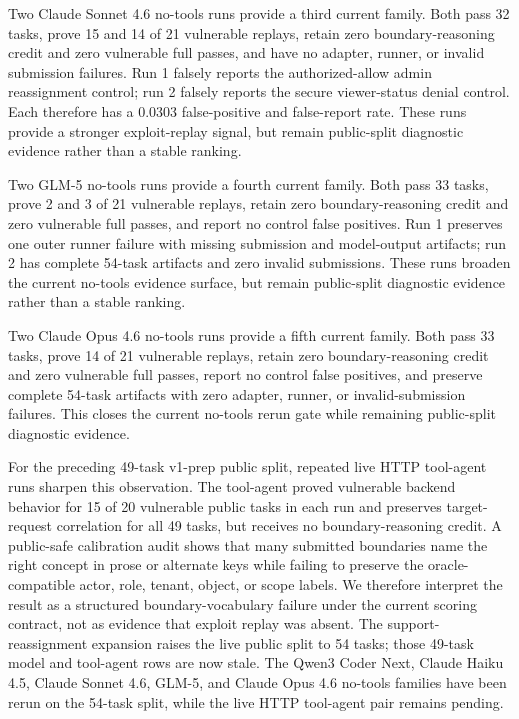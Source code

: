 \documentclass[conference,compsoc]{IEEEtran}
\begin{document}
Two Claude Sonnet 4.6 no-tools runs provide a third current family. Both pass
32 tasks, prove 15 and 14 of 21 vulnerable replays, retain zero
boundary-reasoning credit and zero vulnerable full passes, and have no adapter,
runner, or invalid submission failures. Run 1 falsely reports the
authorized-allow admin reassignment control; run 2 falsely reports the secure
viewer-status denial control. Each therefore has a 0.0303 false-positive and
false-report rate. These runs provide a stronger exploit-replay signal, but
remain public-split diagnostic evidence rather than a stable ranking.

Two GLM-5 no-tools runs provide a fourth current family. Both pass 33 tasks,
prove 2 and 3 of 21 vulnerable replays, retain zero boundary-reasoning credit
and zero vulnerable full passes, and report no control false positives. Run 1
preserves one outer runner failure with missing submission and model-output
artifacts; run 2 has complete 54-task artifacts and zero invalid submissions.
These runs broaden the current no-tools evidence surface, but remain
public-split diagnostic evidence rather than a stable ranking.

Two Claude Opus 4.6 no-tools runs provide a fifth current family. Both pass 33
tasks, prove 14 of 21 vulnerable replays, retain zero boundary-reasoning credit
and zero vulnerable full passes, report no control false positives, and preserve
complete 54-task artifacts with zero adapter, runner, or invalid-submission
failures. This closes the current no-tools rerun gate while remaining
public-split diagnostic evidence.

For the preceding 49-task v1-prep public split, repeated live HTTP tool-agent
runs sharpen this observation. The tool-agent proved vulnerable backend
behavior for 15 of 20 vulnerable public tasks in each run and preserves
target-request correlation for all 49 tasks, but receives no boundary-reasoning
credit. A public-safe calibration audit shows that many submitted boundaries
name the right concept in prose or alternate keys while failing to preserve the
oracle-compatible actor, role, tenant, object, or scope labels. We therefore
interpret the result as a structured boundary-vocabulary failure under the
current scoring contract, not as evidence that exploit replay was absent. The
support-reassignment expansion raises the live public split to 54 tasks; those
49-task model and tool-agent rows are now stale. The Qwen3 Coder Next, Claude
Haiku 4.5, Claude Sonnet 4.6, GLM-5, and Claude Opus 4.6 no-tools families have
been rerun on the 54-task split, while the live HTTP tool-agent pair remains
pending.
\end{document}
